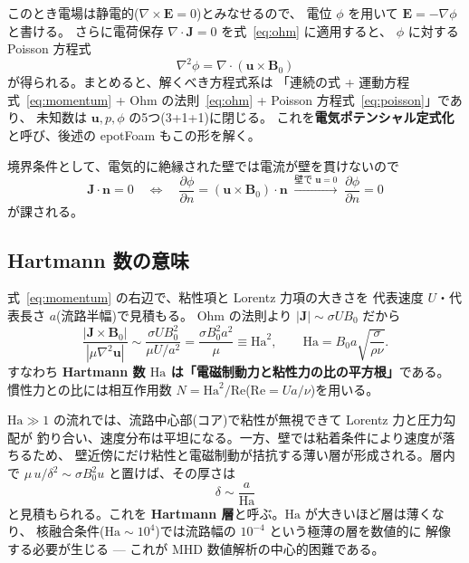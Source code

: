 \documentclass{ltjsarticle}   %
\newcommand{\Ha}{\mathrm{Ha}}
\newcommand{\Rey}{\mathrm{Re}}
\begin{document}
このとき電場は静電的($\nabla\times\boldsymbol{E}=0$)とみなせるので、
電位 $\phi$ を用いて $\boldsymbol{E}=-\nabla\phi$ と書ける。
さらに電荷保存 $\nabla\cdot\boldsymbol{J}=0$ を式~\eqref{eq:ohm} に適用すると、
$\phi$ に対する Poisson 方程式
\begin{equation}
  \nabla^2\phi = \nabla\cdot(\boldsymbol{u}\times\boldsymbol{B}_0)
  \label{eq:poisson}
\end{equation}
が得られる。まとめると、解くべき方程式系は
「連続の式 + 運動方程式~\eqref{eq:momentum} + Ohm の法則~\eqref{eq:ohm}
+ Poisson 方程式~\eqref{eq:poisson}」であり、
未知数は $\boldsymbol{u}, p, \phi$ の5つ(3+1+1)に閉じる。
これを\textbf{電気ポテンシャル定式化}と呼び、後述の epotFoam もこの形を解く。

境界条件として、電気的に絶縁された壁では電流が壁を貫けないので
\begin{equation}
  \boldsymbol{J}\cdot\boldsymbol{n} = 0
  \quad\Longleftrightarrow\quad
  \frac{\partial\phi}{\partial n} = (\boldsymbol{u}\times\boldsymbol{B}_0)\cdot\boldsymbol{n}
  \;\xrightarrow{\text{壁で }\boldsymbol{u}=0}\;
  \frac{\partial\phi}{\partial n} = 0
  \label{eq:insulating}
\end{equation}
が課される。

\subsection{Hartmann 数の意味}

式~\eqref{eq:momentum} の右辺で、粘性項と Lorentz 力項の大きさを
代表速度 $U$・代表長さ $a$(流路半幅)で見積もる。
Ohm の法則より $|\boldsymbol{J}| \sim \sigma U B_0$ だから
\begin{equation}
  \frac{|\boldsymbol{J}\times\boldsymbol{B}_0|}{|\mu\nabla^2\boldsymbol{u}|}
  \sim \frac{\sigma U B_0^2}{\mu U / a^2}
  = \frac{\sigma B_0^2 a^2}{\mu} \equiv \Ha^2,
  \qquad
  \Ha = B_0 a \sqrt{\frac{\sigma}{\rho\nu}}.
  \label{eq:hartmann-number}
\end{equation}
すなわち \textbf{Hartmann 数 $\Ha$ は「電磁制動力と粘性力の比の平方根」}である。
慣性力との比には相互作用数 $N=\Ha^2/\Rey$($\Rey=Ua/\nu$)を用いる。

$\Ha\gg 1$ の流れでは、流路中心部(コア)で粘性が無視できて Lorentz 力と圧力勾配が
釣り合い、速度分布は平坦になる。一方、壁では粘着条件により速度が落ちるため、
壁近傍にだけ粘性と電磁制動が拮抗する薄い層が形成される。層内で
$\mu\, u/\delta^2 \sim \sigma B_0^2 u$ と置けば、その厚さは
\begin{equation}
  \delta \sim \frac{a}{\Ha}
\end{equation}
と見積もられる。これを \textbf{Hartmann 層}と呼ぶ。$\Ha$ が大きいほど層は薄くなり、
核融合条件($\Ha\sim 10^4$)では流路幅の $10^{-4}$ という極薄の層を数値的に
解像する必要が生じる --- これが MHD 数値解析の中心的困難である。
\end{document}
